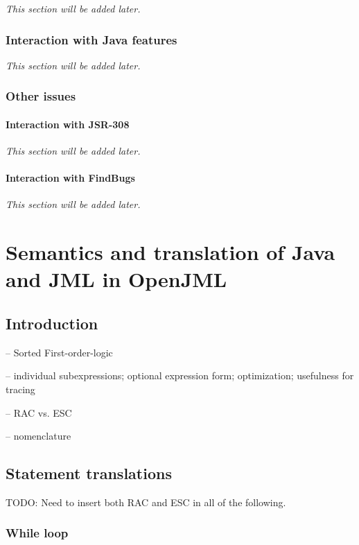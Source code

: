 \documentclass{report}%
\begin{document}
\textit{This section will be added later.} %


\section{Interaction with Java features}

\textit{This section will be added later.} %


\section{Other issues}

\subsection{Interaction with JSR-308}
\textit{This section will be added later.} %

\subsection{Interaction with FindBugs}

\textit{This section will be added later.} %

\part{Semantics and translation of Java and JML in OpenJML}

\chapter{Introduction}

-- Sorted First-order-logic

-- individual subexpressions; optional expression form; optimization; usefulness for tracing

-- RAC vs. ESC

-- nomenclature



\chapter{Statement translations}

TODO: Need to insert both RAC and ESC in all of the following.

\section{While loop}
\end{document}
